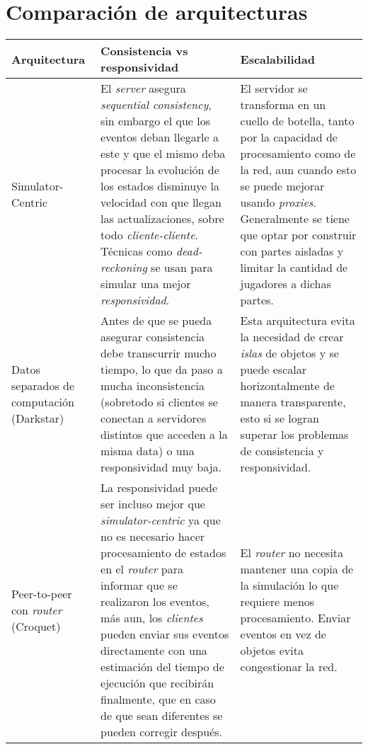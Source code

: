 \section{Comparación de arquitecturas}

%

\small
\begin{longtable}{|p{3cm}|p{6cm}|p{6cm}|}
\hline
\textbf{Arquitectura} & \textbf{Consistencia vs responsividad} & \textbf{Escalabilidad} \\ \hline
Simulator-Centric &
El \emph{server} asegura \emph{sequential consistency}, sin embargo el que los eventos deban llegarle a este y que el mismo deba procesar la evolución de los estados disminuye la velocidad con que llegan las actualizaciones, sobre todo \emph{cliente-cliente}. Técnicas como \emph{dead-reckoning} se usan para simular una mejor \emph{responsividad}. &
El servidor se transforma en un cuello de botella, tanto por la capacidad de procesamiento como de la red, aun cuando esto se puede mejorar usando \emph{proxies}. Generalmente se tiene que optar por construir con partes aisladas y limitar la cantidad de jugadores a dichas partes. \\
\hline
Datos separados de computación (Darkstar) &
Antes de que se pueda asegurar consistencia debe transcurrir mucho tiempo, lo que da paso a mucha inconsistencia (sobretodo si clientes se conectan a servidores distintos que acceden a la misma data) o una responsividad muy baja. &
Esta arquitectura evita la necesidad de crear \emph{islas} de objetos y se puede escalar horizontalmente de manera transparente, esto si se logran superar los problemas de consistencia y responsividad. \\
\hline
Peer-to-peer con \emph{router} (Croquet) &
La responsividad puede ser incluso mejor que \emph{simulator-centric} ya que no es necesario hacer procesamiento de estados en el \emph{router} para informar que se realizaron los eventos, más aun, los \emph{clientes} pueden enviar sus eventos directamente con una estimación del tiempo de ejecución que recibirán finalmente, que en caso de que sean diferentes se pueden corregir después. &
El \emph{router} no necesita mantener una copia de la simulación lo que requiere menos procesamiento. \newline
Enviar eventos en vez de objetos evita congestionar la red. \newline

\end{longtable}
